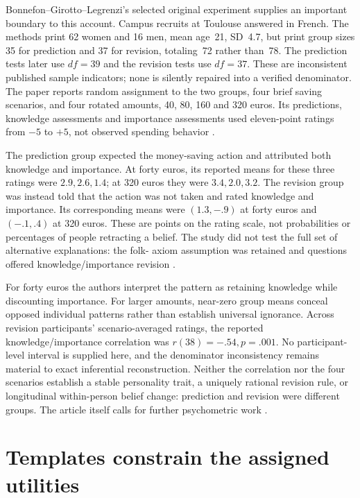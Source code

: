 Bonnefon--Girotto--Legrenzi's selected original experiment supplies an important
boundary to this account. Campus recruits at Toulouse answered in French.
The methods print 62 women and 16 men, mean age~21, SD~4.7, but print group
sizes 35 for prediction and 37 for revision, totaling~72 rather than~78.
The prediction tests later use \(df=39\) and the revision tests use
\(df=37\). These are inconsistent published sample indicators; none is
silently repaired into a verified denominator. The paper reports random
assignment to the two groups, four brief saving scenarios, and four rotated
amounts, 40, 80, 160 and 320 euros. Its predictions, knowledge assessments
and importance assessments used eleven-point ratings from \(-5\) to \(+5\),
not observed spending behavior \cite[pp.~34--36]{BonnefonGirottoLegrenzi2012Preferences}.

The prediction group expected the money-saving action and attributed both
knowledge and importance. At forty euros, its reported means for these three
ratings were \(2.9,2.6,1.4\); at 320 euros they were \(3.4,2.0,3.2\).
The revision group was instead told that the action was not taken and rated
knowledge and importance. Its corresponding means were \((1.3,-.9)\)
at forty euros and \((-.1,.4)\) at 320 euros. These are points on the
rating scale, not probabilities or percentages of people retracting a belief.
The study did not test the full set of alternative explanations: the folk-
axiom assumption was retained and questions offered knowledge/importance
revision \cite[pp.~35--39]{BonnefonGirottoLegrenzi2012Preferences}.

For forty euros the authors interpret the pattern as retaining knowledge
while discounting importance. For larger amounts, near-zero group means
conceal opposed individual patterns rather than establish universal ignorance.
Across revision participants' scenario-averaged ratings, the reported
knowledge/importance correlation was \(r(38)=-.54,p=.001\).
No participant-level interval is supplied here, and the denominator
inconsistency remains material to exact inferential reconstruction.
Neither the correlation nor the four scenarios establish a stable personality
trait, a uniquely rational revision rule, or longitudinal within-person
belief change: prediction and revision were different groups. The article
itself calls for further psychometric work \cite[pp.~37--40]{BonnefonGirottoLegrenzi2012Preferences}.

\section{Templates constrain the assigned utilities}
\label{sec:p19-r64-templates}

